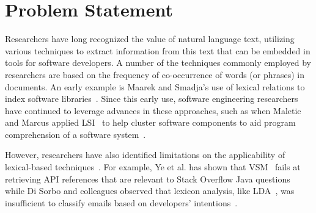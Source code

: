 

\clearpage

\section{Problem Statement}
\label{cp5:motivation}









Researchers have long recognized the value of natural language
text, utilizing various techniques to extract
information from this text that can be embedded in
tools for software developers.
A number of the techniques commonly employed by researchers are based on the
frequency of co-occurrence of words (or phrases) in documents. 
An early example is Maarek and Smadja's use of lexical relations to index
software libraries~\cite{maarek1989}. 
Since this early use, software engineering
researchers have continued to leverage advances in
these approaches, such as when 
Maletic and Marcus applied \acf{LSI}~\cite{deerwester1990LSI} to help cluster software components to aid
program comprehension of a software system~\cite{Marcus2003}.


However, researchers have also identified limitations on the applicability of lexical-based techniques~\cite{silva2019, Ye2016, Sorbo2015}. For example, Ye et al. has shown that \acs{VSM}~\cite{salton1975vector} 
fails at retrieving API references that are relevant to Stack Overflow Java questions~\cite{Ye2016} while
Di Sorbo and colleagues observed that lexicon analysis, like \acs{LDA}~\cite{blei2003latent}, was insufficient to classify 
emails based on developers' intentions~\cite{Sorbo2015}.








